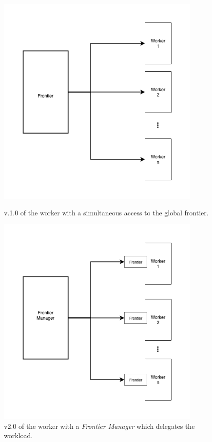 \documentclass{article}
\begin{document}
\begin{figure}
	\begin{minipage}{0.45\textwidth}
		\centering
		\includegraphics[width=0.9\textwidth]{jittered-delay.png}
		\caption{v.1.0 of the worker with a simultaneous access to the global frontier.}
		\label{fig:1}
	\end{minipage}\hfill
	\begin{minipage}{0.45\textwidth}
		\centering
		\includegraphics[width=0.9\textwidth]{frontier-manager.png}
		\caption{v2.0 of the worker with a \textit{Frontier Manager} which delegates the workload.}
		\label{fig:2}
	\end{minipage}
\end{figure}
\end{document}
